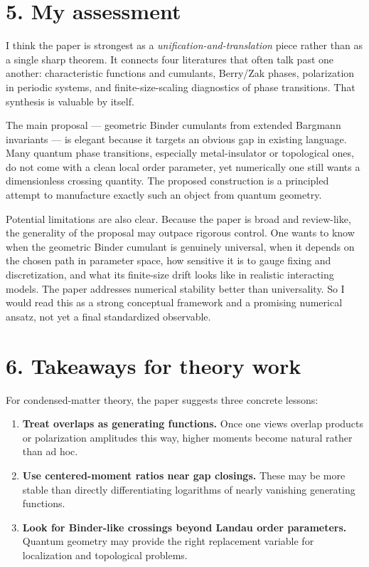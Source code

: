 \documentclass[11pt]{article}
\begin{document}
\section*{5. My assessment}
I think the paper is strongest as a \emph{unification-and-translation} piece rather than as a single sharp theorem. It connects four literatures that often talk past one another: characteristic functions and cumulants, Berry/Zak phases, polarization in periodic systems, and finite-size-scaling diagnostics of phase transitions. That synthesis is valuable by itself.

The main proposal --- geometric Binder cumulants from extended Bargmann invariants --- is elegant because it targets an obvious gap in existing language. Many quantum phase transitions, especially metal-insulator or topological ones, do not come with a clean local order parameter, yet numerically one still wants a dimensionless crossing quantity. The proposed construction is a principled attempt to manufacture exactly such an object from quantum geometry.

Potential limitations are also clear. Because the paper is broad and review-like, the generality of the proposal may outpace rigorous control. One wants to know when the geometric Binder cumulant is genuinely universal, when it depends on the chosen path in parameter space, how sensitive it is to gauge fixing and discretization, and what its finite-size drift looks like in realistic interacting models. The paper addresses numerical stability better than universality. So I would read this as a strong conceptual framework and a promising numerical ansatz, not yet a final standardized observable.

\section*{6. Takeaways for theory work}
For condensed-matter theory, the paper suggests three concrete lessons:
\begin{enumerate}[leftmargin=1.4em]
    \item \textbf{Treat overlaps as generating functions.} Once one views overlap products or polarization amplitudes this way, higher moments become natural rather than ad hoc.
    \item \textbf{Use centered-moment ratios near gap closings.} These may be more stable than directly differentiating logarithms of nearly vanishing generating functions.
    \item \textbf{Look for Binder-like crossings beyond Landau order parameters.} Quantum geometry may provide the right replacement variable for localization and topological problems.
\end{enumerate}
\end{document}

